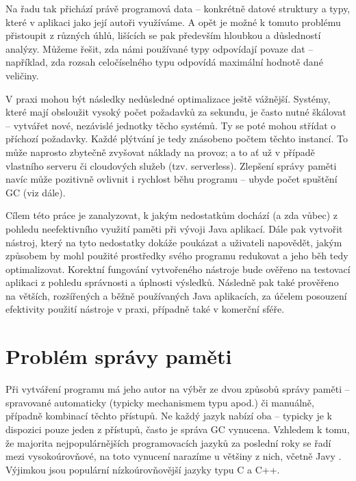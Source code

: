 Na řadu tak přichází právě programová data -- konkrétně datové struktury a typy, které v aplikaci jako její autoři využíváme. A opět je možné k tomuto problému přistoupit z různých úhlů, lišících se pak především hloubkou a důsledností analýzy. Můžeme řešit, zda námi používané typy odpovídají povaze dat -- například, zda rozsah celočíselného typu odpovídá maximální hodnotě dané veličiny.

V praxi mohou být následky nedůsledné optimalizace ještě vážnější. Systémy, které mají obsloužit vysoký počet požadavků za sekundu, je často nutné škálovat -- vytvářet nové, nezávislé jednotky těcho systémů. Ty se poté mohou střídat o příchozí požadavky. Každé plýtvání je tedy znásobeno počtem těchto instancí. To může naprosto zbytečně zvyšovat náklady na provoz; a to ať už v případě vlastního serveru či cloudových služeb (tzv. serverless). Zlepšení správy paměti navíc může pozitivně ovlivnit i rychlost běhu programu -- ubyde počet spuštění GC (viz dále).

Cílem této práce je zanalyzovat, k jakým nedostatkům dochází (a zda vůbec) z pohledu neefektivního využití paměti při vývoji Java aplikací. Dále pak vytvořit nástroj, který na tyto nedostatky dokáže poukázat a uživateli napovědět, jakým způsobem by mohl použité prostředky svého programu redukovat a jeho běh tedy optimalizovat. Korektní fungování vytvořeného nástroje bude ověřeno na testovací aplikaci z pohledu správnosti a úplnosti výsledků. Následně pak také prověřeno na větších, rozšířených a běžně používaných Java aplikacích, za účelem posouzení efektivity použití nástroje v praxi, případně také v komerční sféře.






\chapter{Problém správy paměti}
Při vytváření programu má jeho autor na výběr ze dvou způsobů správy paměti -- spravované automaticky (typicky mechanismem typu  apod.) či manuálně, případně kombinací těchto přístupů. Ne každý jazyk nabízí oba -- typicky je k dispozici pouze jeden z přístupů, často je správa GC vynucena. Vzhledem k tomu, že majorita nejpopulárnějších programovacích jazyků za poslední roky se řadí mezi vysokoúrovňové, na toto vynucení  narazíme u většiny z nich, včetně Javy \cite{stackoverflowinsights}\cite{tiobeindex}. Výjimkou jsou populární nízkoúrovňovější jazyky typu C a C++.

